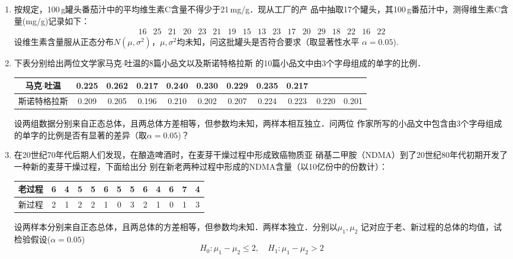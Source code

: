 \documentclass[10pt,a4paper]{article}
\begin{document}
\begin{enumerate}
    \item 按规定，100$\, $g罐头番茄汁中的平均维生素C含量不得少于21$\, $mg/g．现从工厂的产
    品中抽取17个罐头，其100$\, $g番茄汁中，测得维生素C含量(mg/g)记录如下：
    $$\begin{array}{ccccccccccccccccc}
        16 & 25 &  21 & 20 & 23 & 21 & 19 & 15 & 13 & 23 & 17 & 20 & 29 & 18 & 22 & 16 &  22
    \end{array}$$
    设维生素含量服从正态分布$N(\mu,\sigma^2)$，$\mu,\sigma^2$均未知，问这批罐头是否符合要求（取显著性水平
    $\alpha=0.05$).
    \clearpage




    \item 下表分别给出两位文学家马克$\cdot$吐温的8篇小品文以及斯诺特格拉斯
    的10篇小品文中由3个字母组成的单字的比例．
    \renewcommand{\arraystretch}{1.3}
    \begin{table}[H]\centering
        \begin{tabular}{c|cccccccccc}
        马克$\cdot$吐温 & 0.225 & 0.262 & 0.217 & 0.240 & 0.230 & 0.229 & 0.235 & 0.217 &  &  \\ \hline
        斯诺特格拉斯 & 0.209 & 0.205 & 0.196 & 0.210 & 0.202 & 0.207 & 0.224 & 0.223 & 0.220 & 0.201
    \end{tabular}
    \end{table}
    \renewcommand{\arraystretch}{1.0}
    设两组数据分别来自正态总体，且两总体方差相等，但参数均未知，两样本相互独立．问两位
    作家所写的小品文中包含由3个字母组成的单字的比例是否有显著的差异（取$\alpha=0.05$)？
    \clearpage



    \item 在20世纪70年代后期人们发现，在酿造啤酒时，在麦芽干燥过程中形成致癌物质亚
    硝基二甲胺（NDMA）到了20世纪80年代初期开发了一种新的麦芽干燥过程，下面给出分
    别在新老两种过程中形成的NDMA含量（以10亿份中的份数计）：
    \renewcommand{\arraystretch}{1.3}
    \begin{table}[H]\centering
    \begin{tabular}{c|cccccccccccc}
    老过程 & 6 & 4 & 5 & 5 & 6 & 5 & 5 & 6 & 4 & 6 & 7 & 4 \\ \hline
    新过程 & 2 & 1 & 2 & 2 & 1 & 0 & 3 & 2 & 1 & 0 & 1 & 3
    \end{tabular}
    \end{table}
    \renewcommand{\arraystretch}{1.0}
    设两样本分别来自正态总体，且两总体的方差相等，但参数均未知．两样本独立．分别以$\mu_1,\mu_2$
    记对应于老、新过程的总体的均值，试检验假设($\alpha=0.05$)
    $$H_0:\mu_1-\mu_2\leq 2,\quad H_1:\mu_1-\mu_2>2$$
    \clearpage




\end{enumerate}
\end{document}

